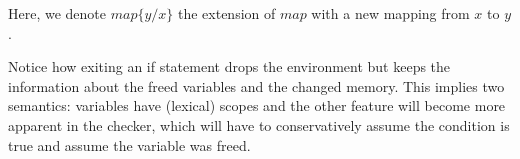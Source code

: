 Here, we denote $map\{y/x\}$ the extension of $map$ with a new mapping from $x$ to $y$.

Notice how exiting an if statement drops the environment but keeps the information about the freed variables and the changed memory. This implies two semantics: variables have (lexical) scopes and the other feature will become more apparent in the checker, which will have to conservatively assume the condition is true and assume the variable was freed.
